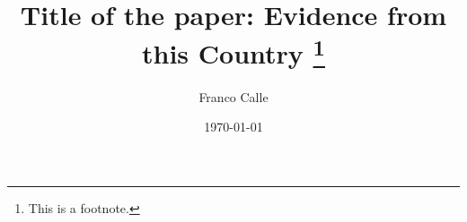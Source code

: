 \title{Title of the paper: Evidence from this Country \footnote{This is a footnote.}}
\date{\today}
\author{Franco Calle}

